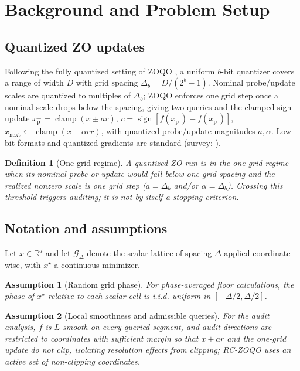 \documentclass{article}
\newtheorem{definition}{Definition}
\newtheorem{assumption}{Assumption}
\newcommand{\R}{\mathbb{R}}
\newcommand{\D}{\Delta}
\newcommand{\G}{\mathcal G}
\begin{document}
\section{Background and Problem Setup}
\label{sec:background}
\subsection{Quantized ZO updates}
Following the fully quantized setting of ZOQO \cite{bar2025zoqo}, a uniform $b$-bit quantizer covers a range of width $D$ with grid spacing $\D_b=D/(2^b-1)$. Nominal probe/update scales are quantized to multiples of $\D_b$; ZOQO enforces one grid step once a nominal scale drops below the spacing, giving two queries and the clamped sign update $x^{\pm}_{\mathrm{p}}=\operatorname{clamp}(x\pm ar)$, $c=\operatorname{sign}[f(x^{+}_{\mathrm{p}})-f(x^{-}_{\mathrm{p}})]$, $x_{\mathrm{next}}\leftarrow\operatorname{clamp}(x-\alpha cr)$, with quantized probe/update magnitudes $a,\alpha$. Low-bit formats and quantized gradients are standard \cite{dettmers2022int8,frantar2023gptq,lin2024awq,courbariaux2016binarized,hubara2017qnn,gupta2015deep,jacob2018quantization,micikevicius2018mixed,alistarh2017qsgd} (survey: \cite{krishnamoorthi2018whitepaper}).

\begin{definition}[One-grid regime]
A quantized ZO run is in the \emph{one-grid regime} when its nominal probe or update would fall below one grid spacing and the realized nonzero scale is one grid step ($a=\D_b$ and/or $\alpha=\D_b$). Crossing this threshold triggers auditing; it is not by itself a stopping criterion.
\end{definition}

\subsection{Notation and assumptions}
Let $x\in\R^d$ and let $\G_{\D}$ denote the scalar lattice of spacing $\D$ applied coordinate-wise, with $x^\star$ a continuous minimizer.
\begin{assumption}[Random grid phase]
\label{ass:phase}
For phase-averaged floor calculations, the phase of $x^\star$ relative to each scalar cell is i.i.d. uniform in $[-\D/2,\D/2]$.
\end{assumption}

\begin{assumption}[Local smoothness and admissible queries]
\label{ass:smooth}
For the audit analysis, $f$ is $L$-smooth on every queried segment, and audit directions are restricted to coordinates with sufficient margin so that $x\pm ar$ and the one-grid update do not clip, isolating resolution effects from clipping; RC-ZOQO uses an active set of non-clipping coordinates.
\end{assumption}
\end{document}
